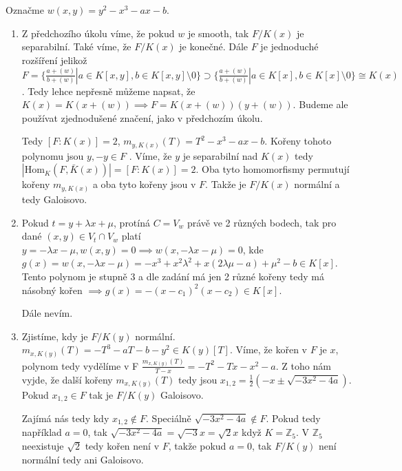 \documentclass[12pt, a4paper]{article}
\begin{document}
\section{}
Označme $w(x,y)=y^2-x^3-ax-b$.
\begin{enumerate}[label=(\alph*)]
    \item Z předchozího úkolu víme, že pokud $w$ je smooth, tak $F/K(x)$ je separabilní. Také víme, že $F/K(x)$ je konečné. Dále $F$ je jednoduché rozšíření jelikož $F = \{\frac{a+(w)}{b+(w)}| a \in K[x,y], b \in K[x,y] \setminus 0 \} \supset \{\frac{a+(w)}{b+(w)}| a \in K[x], b \in K[x] \setminus 0 \} \cong K(x)$. Tedy lehce nepřesně můžeme napsat, že $K(x)=K(x+(w)) \implies F = K(x+(w))(y+(w))$. Budeme ale používat zjednodušené značení, jako v předchozím úkolu. 

    Tedy $[F:K(x)]=2$, $m_{y,K(x)}(T)=T^2 - x^3 - ax -b$. Kořeny tohoto polynomu jsou $y,-y \in F$ . Víme, že $y$ je separabilní nad $K(x)$ tedy  $|\text{Hom}_K(F,\bar{K}(x))|=[F:K(x)]=2$. Oba tyto homomorfismy permutují kořeny $m_{y,K(x)}$ a oba tyto kořeny jsou v $F$. Takže je $F/K(x)$ normální a tedy Galoisovo.

    \item Pokud $t=y+\lambda x + \mu$, protíná $C=V_w$ právě ve 2 různých bodech, tak pro dané $(x,y) \in V_t \cap V_w$ platí $y=-\lambda x - \mu, w(x,y)=0 \implies w(x,-\lambda x - \mu) = 0$, kde $g(x)=w(x,-\lambda x - \mu) = -x^3+x^2 \lambda^2 + x(2\lambda \mu -a)+\mu^2 -b \in K[x]$. Tento polynom je stupně $3$ a dle zadání má jen 2 různé kořeny tedy má násobný kořen $\implies g(x)=-(x-c_1)^2(x-c_2) \in K[x]$. 

    Dále nevím.

    \item Zjistíme, kdy je $F/K(y)$ normální. $m_{x,K(y)}(T) = -T^3-aT-b-y^2 \in K(y)[T]$. Víme, že kořen v $F$ je $x$, polynom tedy vydělíme v F $\frac{m_{x,K(y)}(T)}{T-x} = -T^2-Tx-x^2-a$. Z toho nám vyjde, že další kořeny $m_{x,K(y)}(T)$ tedy jsou $x_{1,2} = \frac{1}{2}(-x\pm \sqrt{-3x^2-4a})$. Pokud $x_{1,2} \in F$ tak je $F/K(y)$ Galoisovo. 

    Zajímá nás tedy kdy $x_{1,2} \notin F$. Speciálně $\sqrt{-3x^2-4a} \notin F$. Pokud tedy například $a = 0$, tak $\sqrt{-3x^2-4a}=\sqrt{-3}x = \sqrt{2}x$ když $K = \mathbb{Z}_5$. V $\mathbb{Z}_5$ neexistuje $\sqrt{2}$ tedy kořen není v $F$, takže pokud $a=0$, tak $F/K(y)$ není normální tedy ani Galoisovo.
\end{enumerate}
\end{document}
